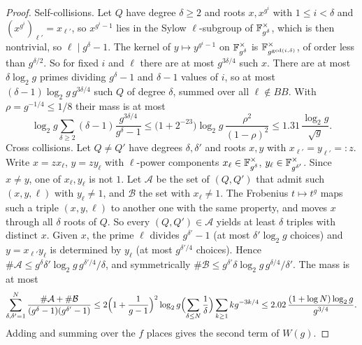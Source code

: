 \begin{proof}
Self-collisions. Let $Q$ have degree $\delta\ge2$ and roots $x,x^{g^i}$ with $1\le i<\delta$ and $(x^{g^i})_{\ell'}=x_{\ell'}$, so $x^{g^i-1}$ lies in the Sylow $\ell$-subgroup of $\mathbb F_{g^\delta}^\times$, which is then nontrivial, so $\ell\mid g^\delta-1$. The kernel of $y\mapsto y^{g^i-1}$ on $\mathbb F_{g^\delta}^\times$ is $\mathbb F_{g^{\gcd(i,\delta)}}^\times$, of order less than $g^{\delta/2}$. So for fixed $i$ and $\ell$ there are at most $g^{3\delta/4}$ such $x$. There are at most $\delta\log_2g$ primes dividing $g^\delta-1$ and $\delta-1$ values of $i$, so at most $(\delta-1)\log_2g\,g^{3\delta/4}$ such $Q$ of degree $\delta$, summed over all $\ell\notin BB$. With $\rho=g^{-1/4}\le1/8$ their mass is at most
\[
\log_2g\sum_{\delta\ge2}(\delta-1)\frac{g^{3\delta/4}}{g^\delta-1}\le\bigl(1+2^{-23}\bigr)\log_2g\,\frac{\rho^2}{(1-\rho)^2}\le1.31\,\frac{\log_2g}{\sqrt g}.
\]
Cross collisions. Let $Q\ne Q'$ have degrees $\delta,\delta'$ and roots $x,y$ with $x_{\ell'}=y_{\ell'}=:z$. Write $x=zx_\ell$, $y=zy_\ell$ with $\ell$-power components $x_\ell\in\mathbb F_{g^\delta}^\times$, $y_\ell\in\mathbb F_{g^{\delta'}}^\times$. Since $x\ne y$, one of $x_\ell,y_\ell$ is not $1$. Let $\mathcal A$ be the set of $(Q,Q')$ that admit such $(x,y,\ell)$ with $y_\ell\ne1$, and $\mathcal B$ the set with $x_\ell\ne1$. The Frobenius $t\mapsto t^g$ maps such a triple $(x,y,\ell)$ to another one with the same property, and moves $x$ through all $\delta$ roots of $Q$. So every $(Q,Q')\in\mathcal A$ yields at least $\delta$ triples with distinct $x$. Given $x$, the prime $\ell$ divides $g^{\delta'}-1$ (at most $\delta'\log_2g$ choices) and $y=x_{\ell'}y_\ell$ is determined by $y_\ell$ (at most $g^{\delta'/4}$ choices). Hence $\#\mathcal A\le g^\delta\delta'\log_2g\,g^{\delta'/4}/\delta$, and symmetrically $\#\mathcal B\le g^{\delta'}\delta\log_2g\,g^{\delta/4}/\delta'$. The mass is at most
\[
\sum_{\delta,\delta'=1}^N\frac{\#\mathcal A+\#\mathcal B}{(g^\delta-1)(g^{\delta'}-1)}\le2\Bigl(1+\frac1{g-1}\Bigr)^2\log_2g\Bigl(\sum_{\delta\le N}\frac1\delta\Bigr)\sum_{k\ge1}kg^{-3k/4}\le2.02\,\frac{(1+\log N)\log_2g}{g^{3/4}}.
\]
Adding and summing over the $f$ places gives the second term of $W(g)$.


\end{proof}
